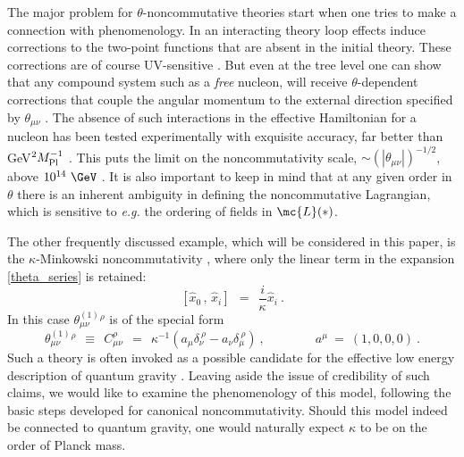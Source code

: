 \documentclass[prl,tightenlines]{revtex4}
\begin{document}
The major problem for $ \theta $-noncommutative theories start when one tries to 
make a connection with phenomenology. In an interacting theory loop effects
induce corrections to the two-point functions that are absent in the initial theory. 
These corrections are of course UV-sensitive \cite{Minwalla:1999px}.
But even at the tree level one can show that any 
compound system such as a {\em free} nucleon, will receive  $\theta$-dependent  corrections 
that couple the angular momentum to the external direction specified by $ \theta_{\mu\nu} $
\cite{Mocioiu:2000ip}.
The absence of such interactions in the effective Hamiltonian for a 
nucleon has been tested experimentally with exquisite accuracy, 
far better than GeV$^2M_{\rm Pl}^{-1}$ \cite{Bear:2000cd,Berglund}. 
This puts the limit on the noncommutativity scale, $\sim (|\theta_{\mu\nu}|)^{-1/2} $,
above $ 10^{14}~\GeV $ \cite{Mocioiu:2000ip,Anisimov:2001zc,Carlson:2001sw}.
It is also important to keep in mind that at any given order in $\theta$ there is 
an inherent ambiguity in defining the noncommutative Lagrangian, which is sensitive to 
{\em e.g.} the ordering 
of fields in $\mc{L}(*)$.  

The other frequently discussed example, which will be considered in 
this paper, is the $ \kappa $-Minkowski noncommutativity
\cite{Freidel:2006gc,Freidel:2007hk,Freidel:2007yu,Meljanac:2007xb,Rim:2008tm},
where only the linear term in the expansion \eqref{theta_series} is retained:
\begin{equation}
\label{space}
	[ \hat{x}_0\,, \, \hat{x}_i ] ~~=~~ \frac{i}{\kappa} \hat{x}_i~.
\end{equation}
In this case $ \theta_{\mu\nu}^{(1)}{}^\rho $ is of the special form
\begin{equation}
\label{def_C}
	\theta_{\mu\nu}^{(1)}{}^\rho ~~\equiv~~  C_{\mu\nu}^\rho ~~=~~ 
		\kappa^{-1}(a_\mu \delta_\nu^{\ \rho} - a_{\nu} \delta_\mu^{\ \rho})~,
		\qquad\qquad  a^{\mu} ~=~ ( 1, 0, 0, 0)~.
\end{equation}
Such a theory is often invoked as a possible candidate for the effective low energy 
description of quantum gravity \cite{Smolin:2004sx,Freidel:2006gc,AmelinoCamelia:2002wr}.
Leaving aside the issue of credibility of such claims, we would like to examine 
the phenomenology of this model, following the basic steps developed for
canonical noncommutativity. Should this model indeed be connected to quantum gravity, 
one would naturally expect $\kappa$ to be on the order of Planck mass.  
\end{document}
